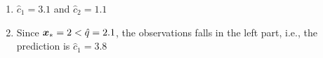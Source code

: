 \documentclass[a4paper]{article}
\begin{document}
{\begin{enumerate}
\begin{itemize}
\begin{align*}
        &= 0.7 + 0.7 + 1 + 1.2 \\
        &= 3.6
      \end{align*}
    \item[$q =  2.1$] 
      \begin{align*}
        \mathcal{R}(1, 1, 2.1) &= \sum_{i=1}^3 |y_i - median(y[1:3])|  + 
        \sum_{i=4}^5 |y_i-median(y[4:5])|\\
        &= \sum_{i=1}^3 |y_i - 3.1|  + \sum_{i=4}^5 |y_i-1.1|\\
        &= 0 + 1.4 + 0.4 + 0.6 + 0.6 \\
        &= 3
      \end{align*}
    \item[$q =  4.0$] 
      \begin{align*}
        \mathcal{R}(1, 1, 4.0) &= \sum_{i=1}^4 |y_i - median(y[1:4])|  + 0 \\
        &= \sum_{i=1}^4 |y_i - 2.9| \\
        &= 0.2 + 1.6 + 0.2 + 1.2  \\
        &= 3.2
      \end{align*}
      Minimal empirical risk is obtained by choosing the split point 
      $\hat{q} = 2.1$
  \end{itemize}
  
  \item $\hat{c}_1 = 3.1$ and $\hat{c}_2 = 1.1$

  \item Since $\bm{x}_* = 2 < \hat{q} = 2.1$,  the observations falls in the left 
  part, i.e., the prediction is $\hat{c}_1 = 3.8$    

\end{enumerate} 

}

\end{document}
